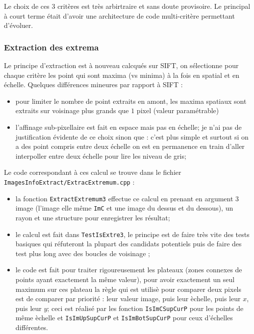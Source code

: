 Le choix de ces $3$ crit\`eres est tr\`es arbirtraire et sans doute provisoire. Le principal 
\`a court terme \'etait d'avoir une architecture de code multi-crit\`ere permettant d'\'evoluer.



\subsubsection{Extraction des extrema}

Le principe d'extraction est \`a nouveau calcqu\'es sur SIFT, on s\'electionne pour chaque
crit\`ere les point qui sont maxima (vs minima) \`a la fois en spatial et en \'echelle.
Quelques diff\'erences mineures par rapport \`a SIFT :

\begin{itemize}
  \item pour limiter le nombre de point extraits en amont, les maxima spatiaux sont 
        extraits sur voisinage plus grands que $1$ pixel (valeur param\'etrable)

  \item l'affinage sub-pixellaire est fait en espace mais pas en \'echelle;  je n'ai pas
        de justification \'evidente de ce choix sinon que : c'est plus simple et surtout 
        si on a des point compris entre deux \'echelle on est en permanence en train d'aller
        interpoller entre deux \'echelle pour lire les niveau de gris;

\end{itemize}


Le code correspondant \`a ces calcul se trouve dans le fichier {\tt ImagesInfoExtract/ExtracExtremum.cpp} :


\begin{itemize}
   \item  la fonction {\tt ExtractExtremum3} effectue ce calcul en prenant en argument $3$ image
          (l'image elle m\^eme {\tt ImC} et une image du dessus et du dessous), un rayon et une 
          structure pour enregistrer les r\'esultat;


   \item le calcul est fait dans {\tt TestIsExtre3}, le principe est de faire tr\`es vite des tests
         basiques qui r\'efuteront la plupart des candidats potentiels puis de faire des test plus
         long avec des boucles de voisinage ;

    \item le code est fait pour traiter rigoureusement les plateaux (zones connexes de points ayant
          exactement la même valeur), pour avoir exactement un seul maximum sur ces plateau la r\`egle
          qui est utilis\`e pour comparer deux pixels est de comparer par priorit\'e : leur valeur image,
          puis leur \`echelle, puis leur $x$, puis leur $y$; ceci est r\'ealis\'e par les fonction
          {\tt IsImCSupCurP} pour les points de m\^eme \`echelle et {\tt IsImUpSupCurP} et {\tt IsImBotSupCurP}
          pour ceux d'\'echelles diff\'erentes.

\end{itemize}


